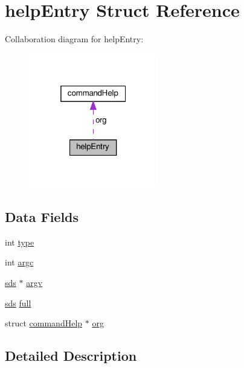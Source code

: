 \hypertarget{structhelp_entry}{}\section{help\+Entry Struct Reference}
\label{structhelp_entry}


Collaboration diagram for help\+Entry\+:
\nopagebreak
\begin{figure}[H]
\begin{center}
\leavevmode
\includegraphics[width=160pt]{structhelp_entry__coll__graph}
\end{center}
\end{figure}
\subsection*{Data Fields}
\begin{DoxyCompactItemize}
\item 
int \hyperlink{structhelp_entry_ac765329451135abec74c45e1897abf26}{type}
\item 
int \hyperlink{structhelp_entry_ad1447518f4372828b8435ae82e48499e}{argc}
\item 
\hyperlink{sds_8h_ad69abac3df4532879db9642c95f5ef6f}{sds} $\ast$ \hyperlink{structhelp_entry_aa7def7b53e4d59718c7aec9c35c75caa}{argv}
\item 
\hyperlink{sds_8h_ad69abac3df4532879db9642c95f5ef6f}{sds} \hyperlink{structhelp_entry_a68871af4f9c205cb2904958ceafed1dc}{full}
\item 
struct \hyperlink{structcommand_help}{command\+Help} $\ast$ \hyperlink{structhelp_entry_a6642ac5df30685d86cd11a44a22f6c21}{org}
\end{DoxyCompactItemize}


\subsection{Detailed Description}


